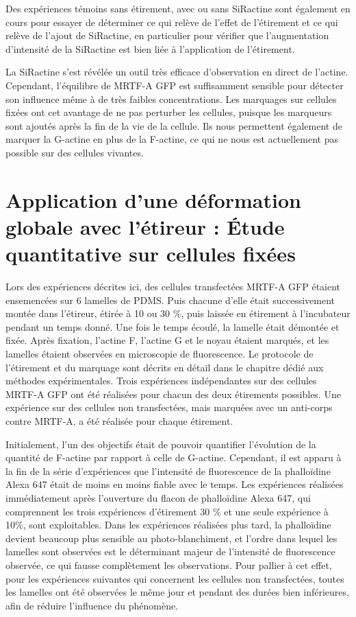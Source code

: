 Des expériences témoins sans étirement, avec ou sans SiRactine sont également en cours pour essayer de déterminer ce qui relève de l'effet de l'étirement et ce qui relève de l'ajout de SiRactine, en particulier pour vérifier que l'augmentation d'intensité de la SiRactine est bien liée à l'application de l'étirement. 

La SiRactine s'est révélée un outil très efficace d'observation en direct de l'actine. Cependant, l'équilibre de MRTF-A GFP est suffisamment sensible pour détecter son influence même à de très faibles concentrations. 
Les marquages sur cellules fixées ont cet avantage de ne pas perturber les cellules, puisque les marqueurs sont ajoutés après la fin de la vie de la cellule. 
Ils nous permettent également de marquer la G-actine en plus de la F-actine, ce qui ne nous est actuellement pas possible sur des cellules vivantes. 


\section{Application d'une déformation globale avec l'étireur : \'Etude quantitative sur cellules fixées}

Lors des expériences décrites ici, des cellules transfectées MRTF-A GFP étaient ensemencées sur 6 lamelles de PDMS. Puis chacune d'elle était successivement montée dans l'étireur, étirée à 10 ou 30 \%, puis laissée en étirement à l'incubateur pendant un temps donné. Une fois le temps écoulé, la lamelle était démontée et fixée. Après fixation, l'actine F, l'actine G et le noyau étaient marqués, et les lamelles étaient observées en microscopie de fluorescence. Le protocole de l'étirement et du marquage sont décrits en détail dans le chapitre dédié aux méthodes expérimentales. 
Trois expériences indépendantes sur des cellules MRTF-A GFP ont été réalisées pour chacun des deux étirements possibles. Une expérience sur des cellules non transfectées, mais marquées avec un anti-corps contre MRTF-A, a été réalisée pour chaque étirement. 

Initialement, l'un des objectifs était de pouvoir quantifier l'évolution de la quantité de F-actine par rapport à celle de G-actine. Cependant, il est apparu à la fin de la série d'expériences que l'intensité de fluorescence de la phalloïdine Alexa 647 était de moins en moins fiable avec le temps. Les expériences réalisées immédiatement après l'ouverture du flacon de phalloïdine Alexa 647, qui comprennent les trois expériences d'étirement 30 \% et une seule expérience à 10\%, sont exploitables. Dans les expériences réalisées plus tard, la phalloïdine devient beaucoup plus sensible au photo-blanchiment, et l'ordre dans lequel les lamelles sont observées est le déterminant majeur de l'intensité de fluorescence observée, ce qui fausse complètement les observations. 
Pour pallier à cet effet, pour les expériences  suivantes qui concernent les cellules non transfectées, toutes les lamelles ont été observées le même jour et pendant des durées bien inférieures, afin de réduire l'influence du phénomène. 

